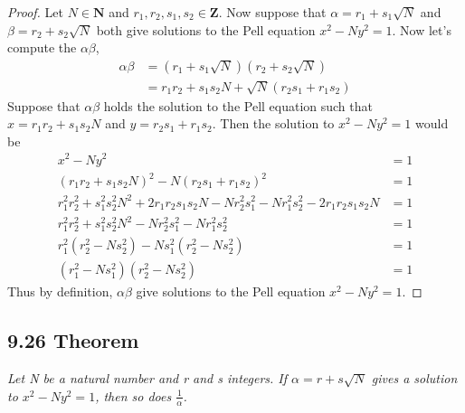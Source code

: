 \documentclass{article}
\begin{document}
\begin{proof}
Let $N \in \mathbf{N}$ and $r_1, r_2, s_1,s_2 \in \mathbf{Z}$. Now suppose that $\alpha = r_1 + s_1\sqrt{N}$ and $\beta = r_2 + s_2\sqrt{N}$ both give solutions to the Pell equation $x^2 - Ny^2 = 1$. Now let's compute the $\alpha \beta$,
\begin{align*}
    && \alpha \beta&= (r_1 + s_1\sqrt{N})(r_2 + s_2\sqrt{N}) &&\\
    &&             &= r_1r_2 + s_1s_2N + \sqrt{N}(r_2s_1 + r_1s_2) &&
\end{align*}
Suppose that $\alpha \beta$ holds the solution to the Pell equation such that $x = r_1r_2 + s_1s_2N$ and $y = r_2s_1 + r_1s_2$. Then the solution to  $x^2 - Ny^2 = 1$ would be
\begin{align*}
    && x^2 - Ny^2 &= 1 &&\\ 
    && (r_1r_2 + s_1s_2N)^2 - N(r_2s_1 + r_1s_2)^2 &= 1 &&\\ 
    && r_1^2r_2^2 + s_1^2s_2^2N^2 + 2r_1r_2s_1s_2N - Nr_2^2s_1^2 - Nr_1^2s_2^2 - 2r_1r_2s_1s_2N  &= 1 &&\\ 
    && r_1^2r_2^2 + s_1^2s_2^2N^2 - Nr_2^2s_1^2 - Nr_1^2s_2^2 &= 1 &&\\ 
    && r_1^2(r_2^2 - Ns_2^2) - Ns_1^2(r_2^2 - Ns_2^2) &= 1 &&\\ 
    && (r_1^2 - Ns_1^2)(r_2^2 - Ns_2^2) &= 1 &&
\end{align*}
Thus by definition, $\alpha \beta$ give solutions to the Pell equation $x^2 - Ny^2 = 1$.
\end{proof}

\subsection*{9.26 Theorem} 
\quad \textit{Let N be a natural number and r and s integers. If $\alpha = r+s\sqrt{N}$ gives a solution to $x^2 - Ny^2 = 1$, then so does $\frac{1}{\alpha}$.}
\end{document}
